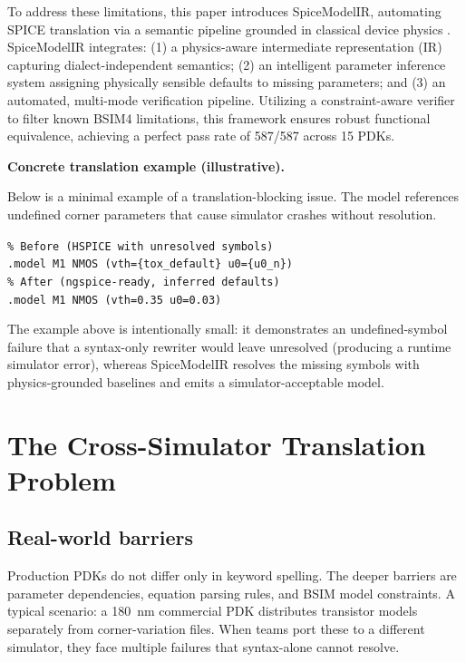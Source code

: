 \documentclass[conference]{IEEEtran}
\begin{document}
To address these limitations, this paper introduces SpiceModelIR, automating SPICE translation via a semantic pipeline grounded in classical device physics \cite{Vladimirescu_1994, Tuinenga_1995, Tsividis_2011, Sze_2007, Baker_2010, Rabaey_2003, Lee_2004, Mead_1980, Cheng_1999_MOSFET, Chauhan_BSIMCMG_2020}. SpiceModelIR integrates: (1) a physics-aware intermediate representation (IR) capturing dialect-independent semantics; (2) an intelligent parameter inference system assigning physically sensible defaults to missing parameters; and (3) an automated, multi-mode verification pipeline. Utilizing a constraint-aware verifier to filter known BSIM4 limitations, this framework ensures robust functional equivalence, achieving a perfect pass rate of 587/587 across 15 PDKs.

\begin{center}
\textbf{Concrete translation example (illustrative).}
\end{center}
Below is a minimal example of a translation-blocking issue. The model references undefined corner parameters that cause simulator crashes without resolution.
\begin{center}
\small
\begin{minipage}{0.85\columnwidth}
\texttt{\% Before (HSPICE with unresolved symbols)}\\
\texttt{.model M1 NMOS (vth=\{tox\_default\} u0=\{u0\_n\})}\\[0.3em]
\texttt{\% After (ngspice-ready, inferred defaults)}\\
\texttt{.model M1 NMOS (vth=0.35 u0=0.03)}
\end{minipage}
\end{center}

The example above is intentionally small: it demonstrates an undefined-symbol failure that a syntax-only rewriter would leave unresolved (producing a runtime simulator error), whereas SpiceModelIR resolves the missing symbols with physics-grounded baselines and emits a simulator-acceptable model.

\section{The Cross-Simulator Translation Problem}
\label{sec:problem}

\subsection{Real-world barriers}
Production PDKs do not differ only in keyword spelling. The deeper barriers are parameter dependencies, equation parsing rules, and BSIM model constraints. A typical scenario: a 180~nm commercial PDK distributes transistor models separately from corner-variation files. When teams port these to a different simulator, they face multiple failures that syntax-alone cannot resolve.
\end{document}
